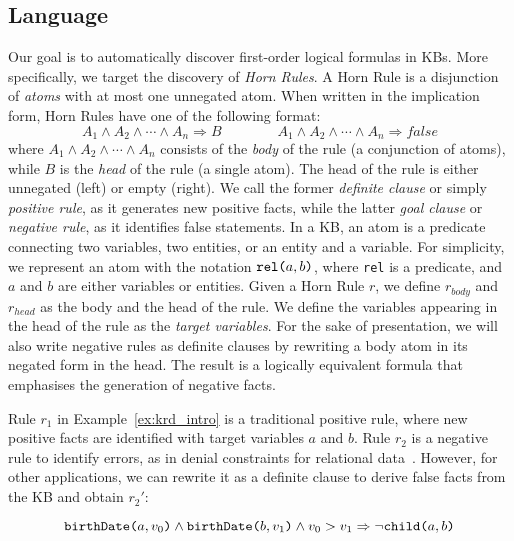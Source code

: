 \subsection{Language} \label{sec:krd_language} 
Our goal is to automatically discover first-order logical formulas in KBs. More specifically, we target the discovery of \emph{Horn Rules}. A Horn Rule is a disjunction of \emph{atoms} with at most one unnegated atom. When written in the implication form, Horn Rules have one of the following format:
%
\begin{equation*}
A_1 \wedge A_2 \wedge \cdots \wedge A_n \Rightarrow B \qquad \qquad A_1 \wedge A_2 \wedge \cdots \wedge A_n \Rightarrow  false 
\end{equation*} %
%
where $A_1 \wedge A_2 \wedge \cdots \wedge A_n$ consists of the \emph{body} of the rule (a conjunction of atoms), while $B$ is the \emph{head} of the rule (a single atom). The head of the rule is either unnegated (left) or empty (right). We call the former \emph{definite clause} or simply \emph{positive rule}, as it generates new positive facts, while the latter \emph{goal clause} or \emph{negative rule}, as it identifies false statements. In a KB, an atom is a predicate connecting two variables, two entities, or an entity and a variable. For simplicity, we represent an atom with the notation $\texttt{rel(}a,b\texttt{)}$, where \texttt{rel} is a predicate, and $a$ and $b$ are either variables or entities. 
Given a Horn Rule $r$, we define $r_{body}$ and $r_{head}$ as the body and the head of the rule. We define the variables appearing in the head of the rule as the \emph{target variables}. 
For the sake of presentation, we will also write negative rules as definite clauses by rewriting a body atom in its negated form in the head. The result is a logically equivalent formula that emphasises the generation of negative facts.

\begin{example}\label{ex:ex2}
Rule $r_1$ in Example~\ref{ex:krd_intro} is a traditional positive rule, where new positive facts are identified with target variables $a$ and $b$.
Rule $r_2$ is a negative rule to identify errors, as in denial constraints for relational data~\cite{chu2013discovering}. However, for other applications, we can rewrite it as a definite clause to derive false facts from the KB and obtain $r_2'$:

		\vspace{-3.5ex}
{\small	
\begin{equation*}
		 \texttt{birthDate(}a,v_0\texttt{)} \wedge \texttt{birthDate(}b,v_1\texttt{)} \wedge v_0 > v_1
		\Rightarrow  \neg \texttt{child(}a,b\texttt{)}  
	\end{equation*}
}
	\vspace{-2.5ex}
\end{example} 

